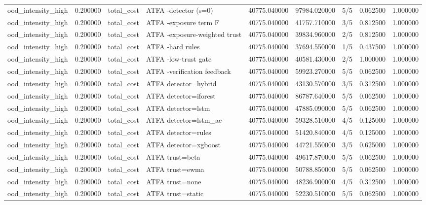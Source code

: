 \begin{tabular}{lrllrrlrr}
ood\_intensity\_high & 0.200000 & total\_cost & ATFA -detector (s=0) & 40775.040000 & 97984.020000 & 5/5 & 0.062500 & 1.000000 \\
ood\_intensity\_high & 0.200000 & total\_cost & ATFA -exposure term F & 40775.040000 & 41757.710000 & 3/5 & 0.812500 & 1.000000 \\
ood\_intensity\_high & 0.200000 & total\_cost & ATFA -exposure-weighted trust & 40775.040000 & 39834.960000 & 2/5 & 0.812500 & 1.000000 \\
ood\_intensity\_high & 0.200000 & total\_cost & ATFA -hard rules & 40775.040000 & 37694.550000 & 1/5 & 0.437500 & 1.000000 \\
ood\_intensity\_high & 0.200000 & total\_cost & ATFA -low-trust gate & 40775.040000 & 40581.430000 & 2/5 & 1.000000 & 1.000000 \\
ood\_intensity\_high & 0.200000 & total\_cost & ATFA -verification feedback & 40775.040000 & 59923.270000 & 5/5 & 0.062500 & 1.000000 \\
ood\_intensity\_high & 0.200000 & total\_cost & ATFA detector=hybrid & 40775.040000 & 43130.570000 & 3/5 & 0.312500 & 1.000000 \\
ood\_intensity\_high & 0.200000 & total\_cost & ATFA detector=iforest & 40775.040000 & 86787.640000 & 5/5 & 0.062500 & 1.000000 \\
ood\_intensity\_high & 0.200000 & total\_cost & ATFA detector=lstm & 40775.040000 & 47885.090000 & 5/5 & 0.062500 & 1.000000 \\
ood\_intensity\_high & 0.200000 & total\_cost & ATFA detector=lstm\_ae & 40775.040000 & 59328.510000 & 4/5 & 0.125000 & 1.000000 \\
ood\_intensity\_high & 0.200000 & total\_cost & ATFA detector=rules & 40775.040000 & 51420.840000 & 4/5 & 0.125000 & 1.000000 \\
ood\_intensity\_high & 0.200000 & total\_cost & ATFA detector=xgboost & 40775.040000 & 44721.550000 & 3/5 & 0.625000 & 1.000000 \\
ood\_intensity\_high & 0.200000 & total\_cost & ATFA trust=beta & 40775.040000 & 49617.870000 & 5/5 & 0.062500 & 1.000000 \\
ood\_intensity\_high & 0.200000 & total\_cost & ATFA trust=ewma & 40775.040000 & 50788.850000 & 5/5 & 0.062500 & 1.000000 \\
ood\_intensity\_high & 0.200000 & total\_cost & ATFA trust=none & 40775.040000 & 48236.900000 & 4/5 & 0.312500 & 1.000000 \\
ood\_intensity\_high & 0.200000 & total\_cost & ATFA trust=static & 40775.040000 & 52230.510000 & 5/5 & 0.062500 & 1.000000 \\

\end{tabular}
